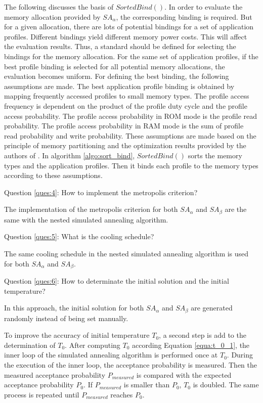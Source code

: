 		The following discusses the basis of $SortedBind()$.
		In order to evaluate the memory allocation provided by $SA_{\alpha}$,
		the corresponding binding is required. But for a given allocation,
		there are lots of potential bindings for a set of application profiles.
		Different bindings yield different memory power costs. This will affect
		the evaluation results.
		Thus, a standard should be defined for selecting the bindings for the
		memory allocation. For the same set of application profiles, if the
		best profile binding is selected for all potential memory allocations, the
		evaluation becomes uniform. For defining the best binding, the following
		assumptions are made.
		The best application profile binding is obtained by mapping frequently
		accessed profiles to small memory types. The profile access frequency
		is dependent on the product of the profile duty cycle and the profile access
		probability. The profile access probability in ROM mode is the profile
		read probability. The profile access probability in RAM mode is the
		sum of profile read probability and write probability.
		These assumptions are made based on the principle of memory partitioning and the
		optimization results provided by the authors of \cite{Strobel2016}.
		In algorithm \ref{algo:sort_bind}, $SortedBind()$ sorts the memory types and
		the application profiles. Then it binds each profile to the memory types
		according to these assumptions.
		 
		Question \ref{ques:4}: How to implement the metropolis criterion?
		
		The implementation of the metropolis criterion for both $SA_{\alpha}$
		and $SA_{\beta}$ are the same with the nested simulated annealing algorithm.
		
		Question \ref{ques:5}: What is the cooling schedule?
		
		The same cooling schedule in the nested simulated annealing algorithm is
		used for both $SA_{\alpha}$ and $SA_{\beta}$.
		
		Question \ref{ques:6}: How to determinate the initial solution and the
		initial temperature?
		
		In this approach, the initial solution for both $SA_{\alpha}$
		and $SA_{\beta}$ are generated randomly instead of being set manually.
		
		To improve the accuracy of initial temperature $T_{0}$, a second step is
		add to the determination of $T_{0}$. After computing $T_{0}$ according
		Equation \ref{equa:t_0_1}, the inner loop of the simulated annealing
		algorithm is performed once at $T_{0}$.
		During the execution of the inner loop, the acceptance probability is measured.
		Then the measured acceptance probability $P_{measured}$ is compared with the
		expected acceptance probability $P_{0}$. If $P_{measured}$ is smaller than
		$P_{0}$, $T_{0}$ is doubled. The same process is repeated until $P_{measured}$
		reaches $P_{0}$.
		
